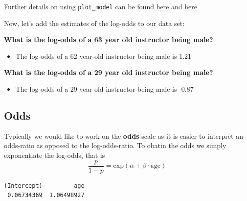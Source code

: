 \documentclass[]{article}
\newenvironment{Shaded}{\begin{snugshade}}{\end{snugshade}}
\newcommand{\KeywordTok}[1]{\textcolor[rgb]{0.13,0.29,0.53}{\textbf{#1}}}
\newcommand{\DataTypeTok}[1]{\textcolor[rgb]{0.13,0.29,0.53}{#1}}
\newcommand{\StringTok}[1]{\textcolor[rgb]{0.31,0.60,0.02}{#1}}
\newcommand{\OperatorTok}[1]{\textcolor[rgb]{0.81,0.36,0.00}{\textbf{#1}}}
\newcommand{\NormalTok}[1]{#1}
\providecommand{\tightlist}{%
  \setlength{\itemsep}{0pt}\setlength{\parskip}{0pt}}
\begin{document}
Further details on using \texttt{plot\_model} can be found
\href{https://strengejacke.wordpress.com/2017/10/23/one-function-to-rule-them-all-visualization-of-regression-models-in-rstats-w-sjplot/}{here}
and \href{https://strengejacke.github.io/sjPlot/index.html}{here}

Now, let's add the estimates of the log-odds to our data set:

\begin{Shaded}
\end{Shaded}

\textbf{What is the log-odds of a 63 year old instructor being male?}

\begin{itemize}
\tightlist
\item
  The log-odds of a 62 year-old instructor being male is 1.21
\end{itemize}

\textbf{What is the log-odds of a 29 year old instructor being male?}

\begin{itemize}
\tightlist
\item
  The log-odds of a 29 year-old instructor being male is -0.87
\end{itemize}

\subsection{Odds}\label{odds}

Typically we would like to work on the \textbf{odds} scale as it is
easier to interpret an odds-ratio as opposed to the log-odds-ratio. To
obatin the odds we simply exponentiate the log-odds, that is
\[\frac{p}{1-p} = \mbox{exp}(\alpha + \beta \cdot \mbox{age})\]

\begin{Shaded}
\end{Shaded}

\begin{verbatim}
(Intercept)         age 
 0.06734369  1.06498927 
\end{verbatim}
\end{document}
